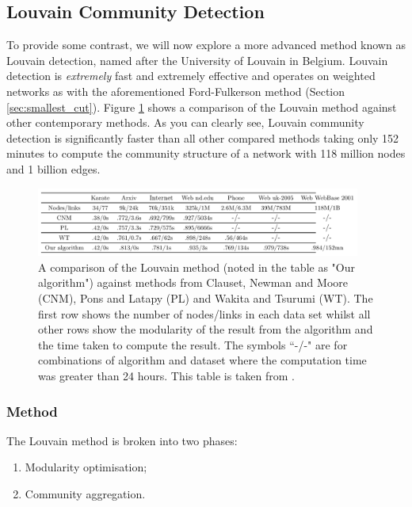 \subsection{Louvain Community Detection}
To provide some contrast, we will now explore a more advanced method known as Louvain detection, named after the University of Louvain in Belgium. Louvain detection is \emph{extremely} fast and extremely effective and operates on weighted networks as with the aforementioned Ford-Fulkerson method (Section \ref{sec:smallest_cut}). Figure \ref{fig:louvain_results_comparison} shows a comparison of the Louvain method against other contemporary methods. As you can clearly see, Louvain community detection is significantly faster than all other compared methods taking only 152 minutes to compute the community structure of a network with 118 million nodes and 1 billion edges.

\begin{figure}
    \begin{center}
        \includegraphics[width=0.95\textwidth]{img/3/comp}
    \end{center}
    \caption{A comparison of the Louvain method (noted in the table as "Our algorithm") against methods from Clauset, Newman and Moore (CNM)\cite{Clauset_2004}, Pons and Latapy (PL)\cite{JGAA-124} and Wakita and Tsurumi (WT)\cite{wakita_tsurumi}. The first row shows the number of nodes/links in each data set whilst all other rows show the modularity of the result from the algorithm and the time taken to compute the result. The symbols ``-/-" are for combinations of algorithm and dataset where the computation time was greater than 24 hours. This table is taken from \cite{Blondel_2008}.}
    \label{fig:louvain_results_comparison}
\end{figure}

\subsubsection*{Method}
The Louvain method is broken into two phases:
\begin{enumerate}
    \item Modularity optimisation;
    \item Community aggregation.
\end{enumerate}

